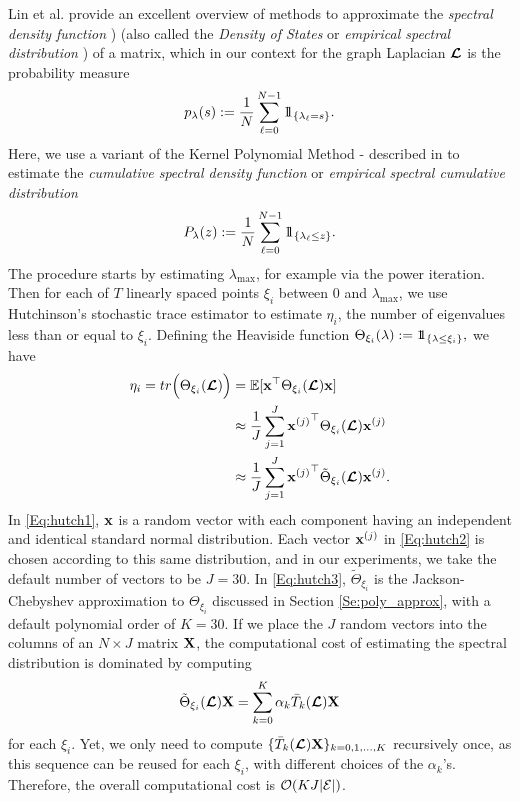 \documentclass[journal, 10pt]{IEEEtran}
\begin{document}
Lin et al. \cite{lin_spectral_density} provide an excellent overview of methods to approximate the \emph{spectral density function} \cite[Chapter 6]{van_mieghem}) (also called the \emph{Density of States} or \emph{empirical spectral distribution} \cite[Chapter 2.4]{tao_random_matrix}) of a matrix, which in our context for the graph Laplacian $\boldsymbol{\mathcal{L}}$ is the probability measure 
\begin{align*}
p_{\lambda}(s):=\frac{1}{N}\sum_{\ell=0}^{N-1} 1\!\!1_{\left\{\lambda_{\ell}=s\right\}}.
\end{align*}
Here, we use a variant of the Kernel Polynomial Method \cite{silver1994densities}\nocite{silver1996kernel}-\cite{wang1994calculating} described in \cite{lin_spectral_density} to estimate the \emph{cumulative spectral density function} or \emph{empirical spectral cumulative distribution}
\begin{align}
P_{\lambda}(z):=\frac{1}{N}\sum_{\ell=0}^{N-1} 1\!\!1_{\left\{\lambda_{\ell}\leq z\right\}}.
\end{align}
The procedure %
starts by estimating $\lambda_{\max}$, for example via the power iteration. Then for each of $T$ linearly spaced points $\xi_i$ between 0 and $\lambda_{\max}$, we use Hutchinson's stochastic trace estimator \cite{hutchinson} to estimate $\eta_i$, the number of eigenvalues less than or equal to $\xi_i$. Defining the Heaviside function $\Theta_{\xi_i}(\lambda):=1\!\!1_{\left\{\lambda \leq \xi_i\right\}},$ we have
\begin{align}
\eta_i =\mbox{tr}\Bigl(\Theta_{\xi_i}(\L)\Bigr) 
&=\mathbb{E}[{\bf x}^{\top}\Theta_{\xi_i}(\L){\bf x}] \label{Eq:hutch1}\\
&\approx \frac{1}{J} \sum_{j=1}^J {{\bf x}^{(j)}}^{\top}\Theta_{\xi_i}(\L){\bf x}^{(j)} \label{Eq:hutch2} \\
&\approx \frac{1}{J} \sum_{j=1}^J {{\bf x}^{(j)}}^{\top}\tilde{\Theta}_{\xi_i}(\L){\bf x}^{(j)}. \label{Eq:hutch3}
\end{align}
In \eqref{Eq:hutch1}, ${\bf x}$ is a random vector with each component having an independent and identical standard normal distribution. Each vector  ${\bf x}^{(j)}$ in \eqref{Eq:hutch2} is chosen according to this same distribution, and in our experiments, we take the default number of vectors to be $J=30$. In \eqref{Eq:hutch3}, $\tilde{\Theta}_{\xi_i}$ is the Jackson-Chebyshev approximation to ${\Theta}_{\xi_i}$ discussed in Section \ref{Se:poly_approx}, with a default polynomial order of $K=30$. If we place the $J$ random vectors into the columns of an $N \times J$ matrix ${\bf X}$, the computational cost of estimating the spectral distribution is dominated by computing 
\begin{align} \label{Eq:hutch4}
\tilde{\Theta}_{\xi_i}(\L){\bf X}=\sum_{k=0}^K \alpha_k \bar{T}_k(\L){\bf X}
\end{align}
 for each $\xi_i$. Yet, %
we only need to compute $\{ \bar{T}_k(\boldsymbol{\mathcal{L}}){\bf X}\}_{k=0,1,\ldots,K}$ recursively once, as this sequence can be reused for each $\xi_i$, with different choices of the $\alpha_k$'s. Therefore, the overall computational cost is ${\cal O}(KJ|\E|)$.
\end{document}

